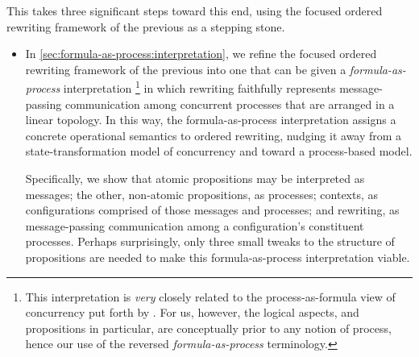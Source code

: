 This  takes three significant steps toward this end, using the focused ordered rewriting framework of the previous  as a stepping stone.
\begin{itemize}[listparindent=\parindent, itemsep=\dimexpr\itemsep+\parsep\relax, parsep=0pt]
\item
  In \cref{sec:formula-as-process:interpretation}, we refine the focused ordered rewriting framework of the previous  into one that can be given a \emph{formula-as-process} interpretation%
  \footnote{This interpretation is \emph{very} closely related to the process-as-formula view of concurrency put forth by \textcites{Miller:??}{Cervesato+Scedrov:IC09}.
    For us, however, the logical aspects, and propositions in particular, are conceptually prior to any notion of process, hence our use of the reversed \emph{formula-as-process} terminology.}
  in which rewriting faithfully represents message-passing communication among concurrent processes that are arranged in a linear topology.
  In this way, the formula-as-process interpretation assigns a concrete operational semantics to ordered rewriting, nudging it away from a state-transformation model of concurrency and toward a process-based model.

  Specifically, we show that atomic propositions may be interpreted as messages;
  the other, non-atomic propositions, as processes;
  contexts, as configurations comprised of those messages and processes;
  and
  rewriting, as mes\-sage-passing communication among a configuration's con\-stit\-u\-ent processes.
  Perhaps surprisingly, only three small tweaks to the structure of propositions are needed to make this formula-as-process interpretation viable.




\end{itemize}
